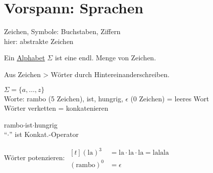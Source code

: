 \section[Vorspann: Sprachen]{Vorspann: Sprachen}
Zeichen, Symbole: Buchstaben, Ziffern\\
hier: abstrakte Zeichen
\begin{Def}[name={[Alphabet $\Sigma$]}]
	Ein \underline{Alphabet} $\Sigma$ ist eine endl. Menge von Zeichen.
	
	Aus Zeichen \-> Wörter durch Hintereinanderschreiben.
\end{Def} %
\begin{Bsp*} $\Sigma = \{a,\dots,z\}$\\
	Worte: rambo (5 Zeichen), ist, hungrig, \qquad $\epsilon$ (0 Zeichen) = leeres Wort\\
	Wörter verketten = konkatenieren
\end{Bsp*}
\begin{Bsp*} rambo$\cdot$ist$\cdot$hungrig\\
	"`$\cdot$"' ist Konkat.-Operator
	
	Wörter potenzieren: $\begin{aligned}[t]
	(\text{la})^3 &= \text{la}\cdot\text{la}\cdot\text{la} = \text{lalala}\\
	(\text{rambo})^0 &= \epsilon
	\end{aligned}$
\end{Bsp*}

